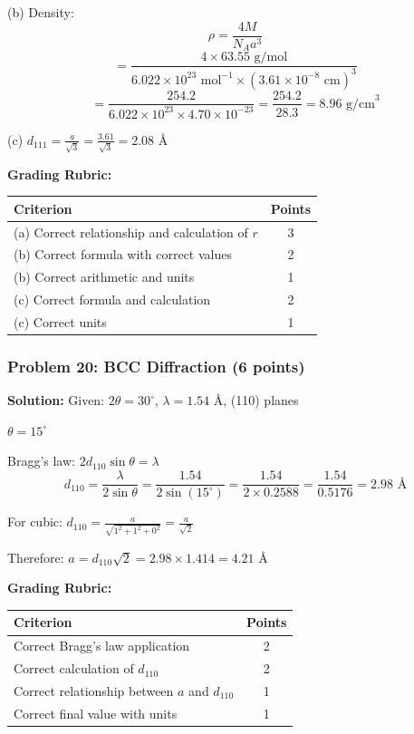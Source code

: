 \documentclass[12pt,a4paper]{article}
\begin{document}
(b) Density:
\[\rho = \frac{4M}{N_A a^3}\]
\[= \frac{4 \times 63.55 \text{ g/mol}}{6.022 \times 10^{23} \text{ mol}^{-1} \times (3.61 \times 10^{-8} \text{ cm})^3}\]
\[= \frac{254.2}{6.022 \times 10^{23} \times 4.70 \times 10^{-23}} = \frac{254.2}{28.3} = 8.96 \text{ g/cm}^3\]

(c) $d_{111} = \frac{a}{\sqrt{3}} = \frac{3.61}{\sqrt{3}} = 2.08 \text{ \AA}$

\textbf{Grading Rubric:}
\begin{table}[h]
\centering
\begin{tabular}{|p{10cm}|c|}
\hline
\textbf{Criterion} & \textbf{Points} \\
\hline
(a) Correct relationship and calculation of $r$ & 3 \\
(b) Correct formula with correct values & 2 \\
(b) Correct arithmetic and units & 1 \\
(c) Correct formula and calculation & 2 \\
(c) Correct units & 1 \\
\hline
\end{tabular}
\end{table}

\subsubsection*{Problem 20: BCC Diffraction (6 points)}
\textbf{Solution:}
Given: $2\theta = 30^\circ$, $\lambda = 1.54$ \AA, (110) planes

$\theta = 15^\circ$

Bragg's law: $2d_{110}\sin\theta = \lambda$
\[d_{110} = \frac{\lambda}{2\sin\theta} = \frac{1.54}{2\sin(15^\circ)} = \frac{1.54}{2 \times 0.2588} = \frac{1.54}{0.5176} = 2.98 \text{ \AA}\]

For cubic: $d_{110} = \frac{a}{\sqrt{1^2 + 1^2 + 0^2}} = \frac{a}{\sqrt{2}}$

Therefore: $a = d_{110}\sqrt{2} = 2.98 \times 1.414 = 4.21 \text{ \AA}$

\textbf{Grading Rubric:}
\begin{table}[h]
\centering
\begin{tabular}{|p{10cm}|c|}
\hline
\textbf{Criterion} & \textbf{Points} \\
\hline
Correct Bragg's law application & 2 \\
Correct calculation of $d_{110}$ & 2 \\
Correct relationship between $a$ and $d_{110}$ & 1 \\
Correct final value with units & 1 \\
\hline
\end{tabular}
\end{table}
\end{document}
